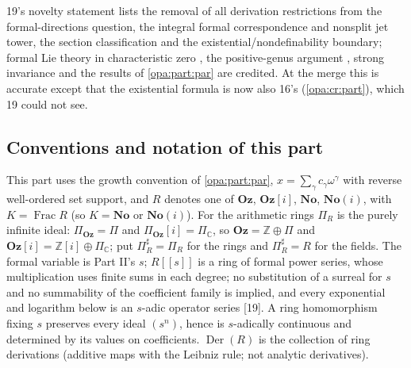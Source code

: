 \documentclass[11pt,oneside]{article}
\numberwithin{equation}{section}
\theoremstyle{definition}
\theoremstyle{remark}
\newcommand{\No}{\mathbf{No}}
\newcommand{\Oz}{\mathbf{Oz}}
\newcommand{\Og}{\mathbf{Oz}[i]}
\newcommand{\SC}{\mathbf{No}(i)}
\newcommand{\C}{\mathbb C}
\newcommand{\Z}{\mathbb Z}
\newcommand{\Frac}{\operatorname{Frac}}
\newcommand{\src}[1]{\textup{\textsf{\small[#1]}}}
\newcommand{\Der}{\operatorname{Der}}
\begin{document}
19's novelty statement lists the removal of all derivation restrictions from the formal-directions question, the integral formal
correspondence and nonsplit jet tower, the section classification and the existential/nondefinability boundary; formal Lie theory in
characteristic zero \cite{Hazewinkel,NT,Bagayoko}, the positive-genus argument \cite{StacksRH}, strong invariance \cite{Hirano} and the
results of \cref{opa:part:par} are credited. At the merge this is accurate except that the existential formula is now also 16's
(\cref{opa:cr:part}), which 19 could not see.

\subsection{Conventions and notation of this part}\label{opa:hs:sub:notation}

This part uses the growth convention of \cref{opa:part:par}, $x=\sum_\gamma c_\gamma\omega^\gamma$ with reverse well-ordered set support,
and $R$ denotes one of $\Oz$, $\Og$, $\No$, $\SC$, with $K=\Frac R$ (so $K=\No$ or $\SC$). For the arithmetic rings $\Pi_R$ is the purely
infinite ideal: $\Pi_\Oz=\Pi$ and $\Pi_\Og=\Pi_\C$, so $\Oz=\Z\oplus\Pi$ and $\Og=\Z[i]\oplus\Pi_\C$; put $\Pi^\sharp_R=\Pi_R$ for the rings
and $\Pi^\sharp_R=R$ for the fields. The formal variable is Part II's $s$; $R[[s]]$ is a ring of formal power series, whose
multiplication uses finite sums in each degree; no substitution of a surreal for $s$ and no summability of the coefficient family is
implied, and every exponential and logarithm below is an $s$-adic operator series \src{19}. A ring homomorphism fixing $s$ preserves every
ideal $(s^n)$, hence is $s$-adically continuous and determined by its values on coefficients. $\Der(R)$ is the collection of ring
derivations (additive maps with the Leibniz rule; not analytic derivatives).
\end{document}
